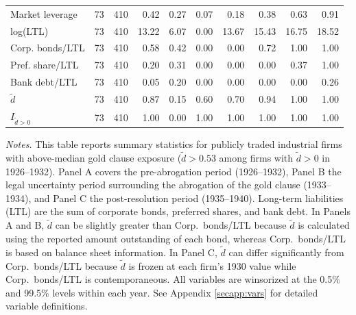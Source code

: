 \begin{table}[p]
\begin{threeparttable}
\begin{tabular}{lrrrrrrrrr}
            Market leverage & 73 & 410 & 0.42 & 0.27 & 0.07 & 0.18 & 0.38 & 0.63 & 0.91 \\
            log(LTL) & 73 & 410 & 13.22 & 6.07 & 0.00 & 13.67 & 15.43 & 16.75 & 18.52 \\
            Corp. bonds/LTL & 73 & 410 & 0.58 & 0.42 & 0.00 & 0.00 & 0.72 & 1.00 & 1.00 \\
            Pref. share/LTL & 73 & 410 & 0.20 & 0.31 & 0.00 & 0.00 & 0.00 & 0.37 & 1.00 \\
            Bank debt/LTL & 73 & 410 & 0.05 & 0.20 & 0.00 & 0.00 & 0.00 & 0.00 & 0.26 \\
            \ensuremath{\tilde{d}} & 73 & 410 & 0.87 & 0.15 & 0.60 & 0.70 & 0.94 & 1.00 & 1.00 \\
            \ensuremath{I_{\tilde{d}>0}} & 73 & 410 & 1.00 & 0.00 & 1.00 & 1.00 & 1.00 & 1.00 & 1.00 \\
            \bottomrule
        \end{tabular}
    \end{threeparttable}

    \vspace*{3mm} \justifying \noindent
\scriptsize{\textit{Notes.} This table reports summary statistics for publicly traded industrial firms with above-median gold clause exposure ($\tilde{d} > 0.53$ among firms with $\tilde{d} > 0$ in 1926--1932). Panel A covers the pre-abrogation period (1926--1932), Panel B the legal uncertainty period surrounding the abrogation of the gold clause (1933--1934), and Panel C the post-resolution period (1935--1940). Long-term liabilities (LTL) are the sum of corporate bonds, preferred shares, and bank debt. In Panels A and B, $\tilde{d}$ can be slightly greater than Corp.\ bonds/LTL because $\tilde{d}$ is calculated using the reported amount outstanding of each bond, whereas Corp.\ bonds/LTL is based on balance sheet information. In Panel C, $\tilde{d}$ can differ significantly from Corp.\ bonds/LTL because $\tilde{d}$ is frozen at each firm's 1930 value while Corp.\ bonds/LTL is contemporaneous. All variables are winsorized at the 0.5\% and 99.5\% levels within each year. See Appendix \ref{secapp:vars} for detailed variable definitions.}
\end{table}